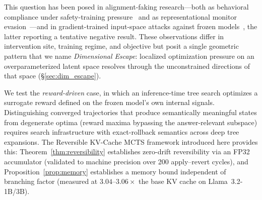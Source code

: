 This question has been posed in alignment-faking research---both as behavioral compliance under safety-training pressure~\citep{greenblatt2024alignment, hubinger2024sleeper} and as representational monitor evasion~\citep{gupta2025rlobfuscation}---and in gradient-trained input-space attacks against frozen models~\citep{bailey2024obfuscated}, the latter reporting a tentative negative result. These observations differ in intervention site, training regime, and objective but posit a single geometric pattern that we name \emph{Dimensional Escape}: localized optimization pressure on an overparameterized latent space resolves through the unconstrained directions of that space (§\ref{sec:dim_escape}).

We test the \emph{reward-driven} case, in which an inference-time tree search optimizes a surrogate reward defined on the frozen model's own internal signals. Distinguishing converged trajectories that produce semantically meaningful states from degenerate optima (reward maxima bypassing the answer-relevant subspace) requires search infrastructure with exact-rollback semantics across deep tree expansions. The Reversible KV-Cache MCTS framework introduced here provides this: Theorem~\ref{thm:reversibility} establishes zero-drift reversibility via an FP32 accumulator (validated to machine precision over 200 apply--revert cycles), and Proposition~\ref{prop:memory} establishes a memory bound independent of branching factor (measured at $3.04$--$3.06\times$ the base KV cache on Llama~3.2-1B/3B).

